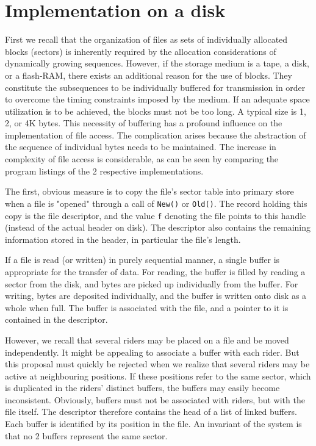 \section{Implementation on a disk}
First we recall that the organization of files as sets of individually allocated blocks (sectors) is
inherently required by the allocation considerations of dynamically growing sequences. However,
if the storage medium is a tape, a disk, or a flash-RAM, there exists an additional reason for the
use of blocks. They constitute the subsequences to be individually buffered for transmission in
order to overcome the timing constraints imposed by the medium. If an adequate space utilization
is to be achieved, the blocks must not be too long. A typical size is 1, 2, or 4K bytes.
This necessity of buffering has a profound influence on the implementation of file access. The
complication arises because the abstraction of the sequence of individual bytes needs to be
maintained. The increase in complexity of file access is considerable, as can be seen by
comparing the program listings of the 2 respective implementations.

The first, obvious measure is to copy the file's sector table into primary store when a file is
"opened" through a call of \verb|New()| or \verb|Old()|. The record holding this copy is the file
descriptor, and the value \verb|f| denoting the file points to this handle (instead of the actual header
on disk). The descriptor also contains the remaining information stored in the header, in particular
the file's length.

If a file is read (or written) in purely sequential manner, a single buffer is appropriate for the
transfer of data. For reading, the buffer is filled by reading a sector from the disk, and bytes are
picked up individually from the buffer. For writing, bytes are deposited individually, and the buffer
is written onto disk as a whole when full. The buffer is associated with the file, and a pointer to it
is contained in the descriptor.

However, we recall that several riders may be placed on a file and be moved independently. It might be
appealing to associate a buffer with each rider. But this proposal must quickly be rejected when we
realize that several riders may be active at neighbouring positions. If these positions refer to the
same sector, which is duplicated in the riders' distinct buffers, the buffers may easily become
inconsistent. Obviously, buffers must not be associated with riders, but with the file itself. The
descriptor therefore contains the head of a list of linked buffers. Each buffer is identified by its
position in the file. An invariant of the system is that no 2 buffers represent the same sector.

